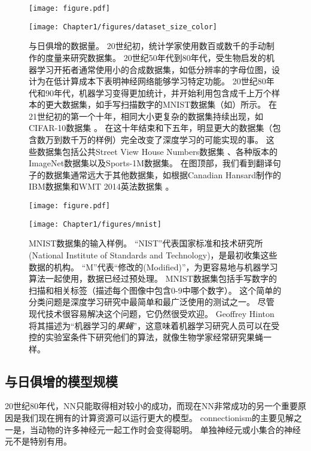 \begin{figure}[!htb]
\ifOpenSource
\centerline{\texttt{[image: figure.pdf]}}
\else
\centerline{\texttt{[image: Chapter1/figures/dataset\_size\_color]}}
\fi
\caption{与日俱增的数据量。
20世纪初，统计学家使用数百或数千的手动制作的度量来研究数据集\citep{garson:1900,student08ttest,IrisData1935,Fisher-1936}。
20世纪50年代到80年代，受生物启发的机器学习开拓者通常使用小的合成数据集，如低分辨率的字母位图，设计为在低计算成本下表明神经网络能够学习特定功能\citep{Widrow60,Rumelhart86c}。
20世纪80年代和90年代，机器学习变得更加统计，并开始利用包含成千上万个样本的更大数据集，如手写扫描数字的MNIST数据集（如）所示\citep{LeCun98-small}。
在21世纪初的第一个十年，相同大小更复杂的数据集持续出现，如CIFAR-10数据集\citep{KrizhevskyHinton2009} 。
在这十年结束和下五年，明显更大的数据集（包含数万到数千万的样例）完全改变了深度学习的可能实现的事。
这些数据集包括公共Street View House Numbers数据集 \citep{Netzer-wkshp-2011}、各种版本的ImageNet数据集\citep{imagenet_cvpr09,Deng2010,ILSVRCarxiv14}以及Sports-1M数据集\citep{KarpathyCVPR14}。
在图顶部，我们看到翻译句子的数据集通常远大于其他数据集，如根据Canadian Hansard制作的IBM数据集\citep{brown1990statistical}和WMT 2014英法数据集\citep{wmt14} 。
}
\label{fig:chap1_dataset_size_color}
\end{figure}
\begin{figure}[!htb]
\ifOpenSource
\centerline{\texttt{[image: figure.pdf]}}
\else
\centerline{\texttt{[image: Chapter1/figures/mnist]}}
\fi
\caption{MNIST数据集的输入样例。
``NIST''代表国家标准和技术研究所(National Institute of Standards and Technology)，是最初收集这些数据的机构。
``M''代表``修改的(Modified)''，为更容易地与机器学习算法一起使用，数据已经过预处理。
MNIST数据集包括手写数字的扫描和相关标签（描述每个图像中包含0-9中哪个数字）。
这个简单的分类问题是深度学习研究中最简单和最广泛使用的测试之一。
尽管现代技术很容易解决这个问题，它仍然很受欢迎。
Geoffrey Hinton将其描述为``机器学习的\emph{果蝇}''，这意味着机器学习研究人员可以在受控的实验室条件下研究他们的算法，就像生物学家经常研究果蝇一样。
}
\label{fig:chap1_mnist}
\end{figure}


\subsection{与日俱增的模型规模}
\label{sec:increasing_model_sizes}


20世纪80年代，\gls{NN}只能取得相对较小的成功，而现在\gls{NN}非常成功的另一个重要原因是我们现在拥有的计算资源可以运行更大的模型。
\gls{connectionism}的主要见解之一是，当动物的许多神经元一起工作时会变得聪明。
单独神经元或小集合的神经元不是特别有用。

